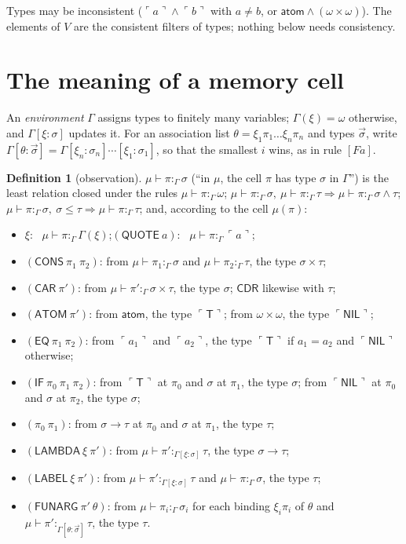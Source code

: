 \documentclass[11pt]{amsart}
\theoremstyle{definition}
\newtheorem{definition}[theorem]{Definition}
\theoremstyle{remark}
\newcommand{\kw}[1]{\mathsf{#1}}
\newcommand{\at}[1]{\ulcorner #1\urcorner}
\newcommand{\Atom}{\mathsf{atom}}
\newcommand{\obs}[4]{#1\vdash #2:_{#3}#4}
\newcommand{\T}{\mathsf{T}}
\newcommand{\NIL}{\mathsf{NIL}}
\begin{document}
Types may be inconsistent ($\at a\wedge\at b$ with $a\ne b$, or
$\Atom\wedge(\omega\times\omega)$). The elements of $V$ are the consistent
filters of types; nothing below needs consistency.

\section{The meaning of a memory cell}

An \emph{environment} $\Gamma$ assigns types to finitely many variables;
$\Gamma(\xi)=\omega$ otherwise, and $\Gamma[\xi:\sigma]$ updates it. For
an association list $\theta=\xi_1\pi_1\dots\xi_n\pi_n$ and types
$\vec\sigma$, write $\Gamma[\theta:\vec\sigma]=\Gamma[\xi_n:\sigma_n]\cdots[\xi_1:\sigma_1]$,
so that the smallest $i$ wins, as in rule $[Fa]$.

\begin{definition}[observation]
$\obs\mu\pi\Gamma\sigma$ (``in $\mu$, the cell $\pi$ has type $\sigma$ in
$\Gamma$'') is the least relation closed under the rules
$\obs\mu\pi\Gamma\omega$;
$\obs\mu\pi\Gamma\sigma,\ \obs\mu\pi\Gamma\tau\Rightarrow\obs\mu\pi\Gamma{\sigma\wedge\tau}$;
$\obs\mu\pi\Gamma\sigma,\ \sigma\le\tau\Rightarrow\obs\mu\pi\Gamma\tau$;
and, according to the cell $\mu(\pi)$:
\begin{itemize}
\item $\xi$: \ $\obs\mu\pi\Gamma{\Gamma(\xi)}$;\quad $(\kw{QUOTE}\ a)$: \ $\obs\mu\pi\Gamma{\at a}$;
\item $(\kw{CONS}\ \pi_1\ \pi_2)$: from $\obs\mu{\pi_1}\Gamma\sigma$ and $\obs\mu{\pi_2}\Gamma\tau$, the type $\sigma\times\tau$;
\item $(\kw{CAR}\ \pi')$: from $\obs\mu{\pi'}\Gamma{\sigma\times\tau}$, the type $\sigma$; $\kw{CDR}$ likewise with $\tau$;
\item $(\kw{ATOM}\ \pi')$: from $\Atom$, the type $\at\T$; from $\omega\times\omega$, the type $\at\NIL$;
\item $(\kw{EQ}\ \pi_1\ \pi_2)$: from $\at{a_1}$ and $\at{a_2}$, the type $\at\T$ if $a_1=a_2$ and $\at\NIL$ otherwise;
\item $(\kw{IF}\ \pi_0\ \pi_1\ \pi_2)$: from $\at\T$ at $\pi_0$ and $\sigma$ at $\pi_1$, the type $\sigma$; from $\at\NIL$ at $\pi_0$ and $\sigma$ at $\pi_2$, the type $\sigma$;
\item $(\pi_0\ \pi_1)$: from $\sigma\to\tau$ at $\pi_0$ and $\sigma$ at $\pi_1$, the type $\tau$;
\item $(\kw{LAMBDA}\ \xi\ \pi')$: from $\obs\mu{\pi'}{\Gamma[\xi:\sigma]}\tau$, the type $\sigma\to\tau$;
\item $(\kw{LABEL}\ \xi\ \pi')$: from $\obs\mu{\pi'}{\Gamma[\xi:\sigma]}\tau$ and $\obs\mu\pi\Gamma\sigma$, the type $\tau$;
\item $(\kw{FUNARG}\ \pi'\ \theta)$: from $\obs\mu{\pi_i}\Gamma{\sigma_i}$ for each binding $\xi_i\pi_i$ of $\theta$ and $\obs\mu{\pi'}{\Gamma[\theta:\vec\sigma]}\tau$, the type $\tau$.
\end{itemize}
\end{definition}
\end{document}
